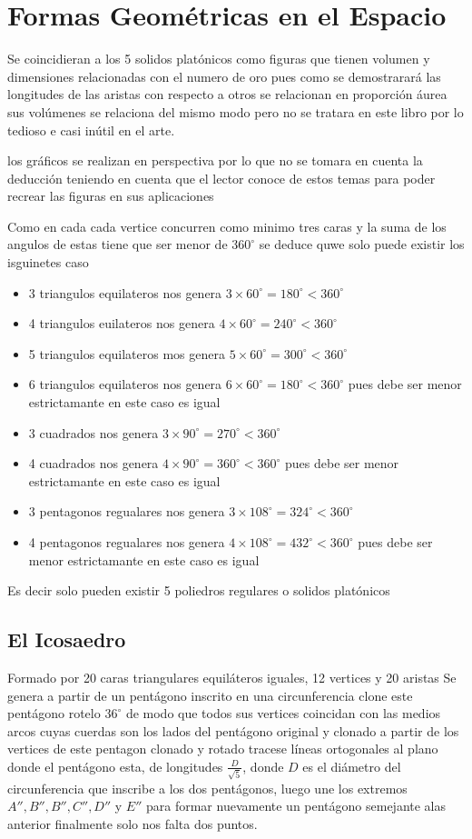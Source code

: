 
\chapter{Formas Geométricas en el Espacio}
Se coincidieran a los 5 solidos platónicos como figuras que tienen volumen y dimensiones relacionadas con el numero de oro pues como se demostrarará  las longitudes de las aristas con respecto a otros se relacionan en proporción áurea sus volúmenes se relaciona del mismo modo pero no se tratara en este libro por lo tedioso e casi inútil en el arte.

los gráficos se realizan en perspectiva por lo que no se tomara en cuenta la deducción teniendo en cuenta que el lector conoce de estos temas  para poder recrear las figuras en sus aplicaciones


Como en cada cada vertice concurren como minimo tres caras y la suma de los angulos de estas tiene que ser menor de $360^\circ$ se deduce quwe solo puede existir los isguinetes caso

\begin{itemize}
  \item 3 triangulos equilateros nos genera $3\times 60^\circ=180^\circ < 360^\circ$
  \item 4 triangulos euilateros nos genera $4\times 60^\circ=240^\circ < 360^\circ$
  \item 5 triangulos equilateros mos genera $5\times 60^\circ=300^\circ < 360^\circ$
  \item 6 triangulos equilateros nos genera $6\times 60^\circ=180^\circ < 360^\circ$ pues debe ser menor estrictamante en este caso es igual
  \item 3 cuadrados nos genera $3\times 90^\circ=270^\circ < 360^\circ$
  \item 4 cuadrados nos genera $4\times 90^\circ=360^\circ < 360^\circ$ pues debe ser menor estrictamante en este caso es igual
  \item 3 pentagonos regualares nos genera $3\times 108^\circ=324^\circ < 360^\circ$
  \item 4 pentagonos regualares nos genera $4\times 108^\circ=432^\circ < 360^\circ$ pues debe ser menor estrictamante en este caso es igual
\end{itemize}

 Es decir solo pueden existir  5 poliedros regulares o solidos platónicos

\section{El Icosaedro}
Formado por 20 caras triangulares equiláteros iguales, 12 vertices y 20 aristas
Se genera a partir de un pentágono inscrito en una circunferencia  clone este pentágono rotelo $36^\circ$ de modo que todos sus vertices coincidan con las medios arcos cuyas cuerdas son los lados del pentágono original y clonado  a partir de los vertices de este pentagon clonado y rotado  tracese líneas ortogonales al plano donde el pentágono esta, de longitudes $\frac{D}{\sqrt{5}}$, donde $D$ es el diámetro del circunferencia que inscribe a los dos pentágonos, luego une los extremos $A'',B'',B'',C'',D''$ y $E''$ para formar nuevamente un pentágono semejante alas anterior finalmente solo nos falta dos puntos.


